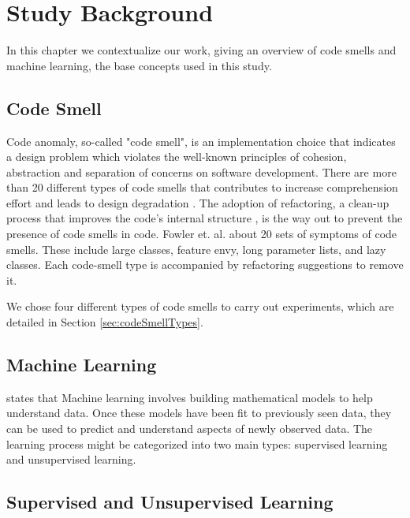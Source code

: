 \chapter{Study Background} 
\label{sec:background}

In this chapter we contextualize our work, giving an overview of code smells and machine learning, the base concepts used in this study.

\section{Code Smell}

Code anomaly, so-called "code smell", is an implementation choice that indicates a design problem which violates the well-known principles of cohesion, abstraction and separation of concerns \cite{oizumi2016code} on software development. There are more than 20 \cite{fowler1999refactoring} different types of code smells that contributes to increase comprehension effort \cite{abbes2011empirical} and leads to design degradation \cite{oizumi2016code}. The adoption of refactoring, a clean-up process that improves the code's internal structure \cite{fowler1999refactoring}, is the way out to prevent the presence of code smells in code. Fowler et. al. \cite{fowler1999refactoring} about 20 sets of symptoms of code smells. These include large classes, feature envy, long parameter lists, and lazy classes. Each code-smell type is accompanied by refactoring suggestions to remove it.

We chose four different types of code smells to carry out experiments, which are detailed in Section \ref{sec:codeSmellTypes}.


\section{Machine Learning}
\cite{vanderplas2016python} states that Machine learning involves building mathematical models to help
understand data. Once these models have been fit to previously
seen data, they can be used to predict and understand aspects of newly observed data. The learning process might be categorized into two main types: supervised learning and unsupervised learning. 

\section{Supervised and Unsupervised Learning}


